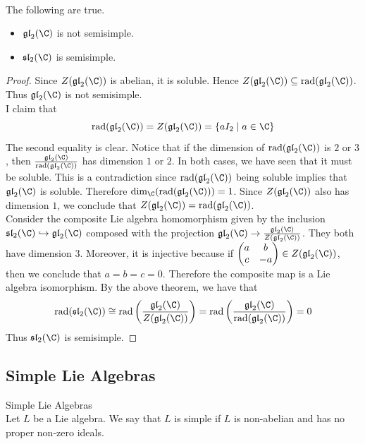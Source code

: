 \documentclass[a4paper]{article}
\begin{document}
\begin{eg}{}{} \\The following are true. 
\begin{itemize}
\item $\mathfrak{gl}_2(\C)$ is not semisimple. 
\item $\mathfrak{sl}_2(\C)$ is semisimple. 
\end{itemize} 
\begin{proof}
Since $Z(\mathfrak{gl}_2(\C))$ is abelian, it is soluble. Hence $Z(\mathfrak{gl}_2(\C))\subseteq\text{rad}(\mathfrak{gl}_2(\C))$. Thus $\mathfrak{gl}_2(\C)$ is not semisimple. \\

I claim that $$\text{rad}(\mathfrak{gl}_2(\C))=Z(\mathfrak{gl}_2(\C))=\{aI_2\;|\;a\in\C\}$$ The second equality is clear. Notice that if the dimension of $\text{rad}(\mathfrak{gl}_2(\C))$ is $2$ or $3$, then $\frac{\mathfrak{gl}_2(\C)}{\text{rad}(\mathfrak{gl}_2(\C))}$ has dimension $1$ or $2$. In both cases, we have seen that it must be soluble. This is a contradiction since $\text{rad}(\mathfrak{gl}_2(\C))$ being soluble implies that $\mathfrak{gl}_2(\C)$ is soluble. Therefore $\dim_\C(\text{rad}(\mathfrak{gl}_2(\C)))=1$. Since $Z(\mathfrak{gl}_2(\C))$ also has dimension $1$, we conclude that $Z(\mathfrak{gl}_2(\C))=\text{rad}(\mathfrak{gl}_2(\C))$. \\

Consider the composite Lie algebra homomorphism given by the inclusion $\mathfrak{sl}_2(\C)\hookrightarrow\mathfrak{gl}_2(\C)$ composed with the projection $\mathfrak{gl}_2(\C)\to\frac{\mathfrak{gl}_2(\C)}{Z(\mathfrak{gl}_2(\C))}$. They both have dimension $3$. Moreover, it is injective because if $\begin{pmatrix}
a & b\\
c & -a
\end{pmatrix}\in Z(\mathfrak{gl}_2(\C))$, then we conclude that $a=b=c=0$. Therefore the composite map is a Lie algebra isomorphism. By the above theorem, we have that $$\text{rad}(\mathfrak{sl}_2(\C))\cong\text{rad}\left(\frac{\mathfrak{gl}_2(\C)}{Z(\mathfrak{gl}_2(\C))}\right)=\text{rad}\left(\frac{\mathfrak{gl}_2(\C)}{\text{rad}(\mathfrak{gl}_2(\C))}\right)=0$$ Thus $\mathfrak{sl}_2(\C)$ is semisimple. 
\end{proof}
\end{eg}

\subsection{Simple Lie Algebras}
\begin{defn}{Simple Lie Algebras}{} \\Let $L$ be a Lie algebra. We say that $L$ is simple if $L$ is non-abelian and has no proper non-zero ideals. 
\end{defn}
\end{document}
